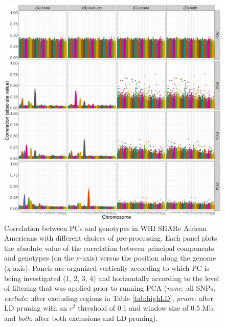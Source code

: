 \documentclass[12pt]{article}
\begin{document}
\begin{figure}
\center
\includegraphics[width=\textwidth]{figs/WHI/pc_geno_corr/pc_geno_corr}
\caption{Correlation between PCs and genotypes in WHI SHARe African Americans with different choices of pre-processing. Each panel plots the absolute value of the correlation between principal components and genotypes (on the y-axis) versus the position along the genome (x-axis).  Panels are organized vertically according to which PC is being investigated (1, 2, 3, 4) and horizontally according to the level of filtering that was applied prior to running PCA (\textit{none}: all SNPs, \textit{exclude}: after excluding regions in Table \ref{tab:highLD}, \textit{prune}: after LD pruning with an $r^2$ threshold of 0.1 and window size of 0.5 Mb, and \textit{both}: after both exclusions and LD pruning).}
\label{fig:corr-compare}
\end{figure}


\end{document}
